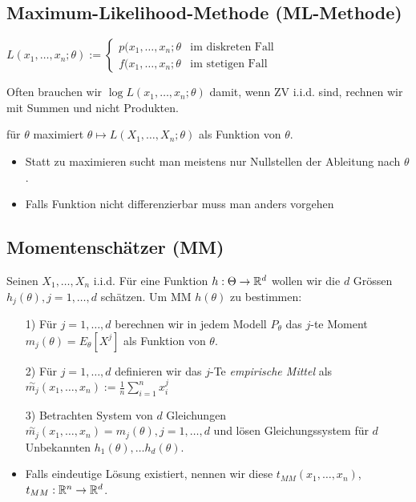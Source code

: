 \subsection{Maximum-Likelihood-Methode (ML-Methode)}
\begin{itemize}
     $L(x_1, \dots, x_n; \theta) :=
\begin{cases}
    p(x_1, \dots, x_n; \theta &\text{im diskreten Fall}\\
    f(x_1, \dots, x_n; \theta &\text{im stetigen Fall}
\end{cases}$
        \begin{itemize}
             Often brauchen wir $\log L(x_1, \dots, x_n;\theta)$ damit, wenn ZV i.i.d. sind, rechnen wir mit Summen und nicht Produkten.
        \end{itemize}
         für $\theta$ maximiert $\theta \mapsto L(X_1, \dots, X_n;\theta)$ als Funktion von $\theta$.
        \begin{itemize}
            \item Statt zu maximieren sucht man meistens nur Nullstellen der Ableitung nach $\theta$.
            \item Falls Funktion nicht differenzierbar muss man anders vorgehen
        \end{itemize}
\end{itemize}

\subsection{Momentenschätzer (MM)}
Seinen $X_1, \dots, X_n$ i.i.d. Für eine Funktion $h: \Theta \to \mathbb{R}^d$ wollen wir die $d$ Grössen $h_j(\theta), j = 1, \dots, d$ schätzen. Um MM $h(\theta)$ zu bestimmen:
\begin{itemize}
    \item[1)] Für $j = 1, \dots, d$ berechnen wir in jedem Modell $P_\theta$ das $j$-te Moment $m_j(\theta) = E_\theta[X^j]$ als Funktion von $\theta$.
    \item[2)] Für $j = 1, \dots, d$ definieren wir das $j$-Te \textit{empirische Mittel} als $\overset{\sim}{m_j}(x_1, \dots, x_n) := \frac{1}{n} \sum_{i=1}^{n} x_i^j$
    \item[3)] Betrachten System von $d$ Gleichungen $\overset{\sim}{m_j}(x_1, \dots, x_n) = m_j(\theta), j = 1, \dots, d$ und lösen Gleichungssystem für $d$ Unbekannten $h_1(\theta), \dots h_d(\theta)$.
    \item Falls eindeutige Lösung existiert, nennen wir diese $t_{MM}(x_1, \dots, x_n)$, $t_{MM}: \mathbb{R}^n \to \mathbb{R}^d$.
\end{itemize}

